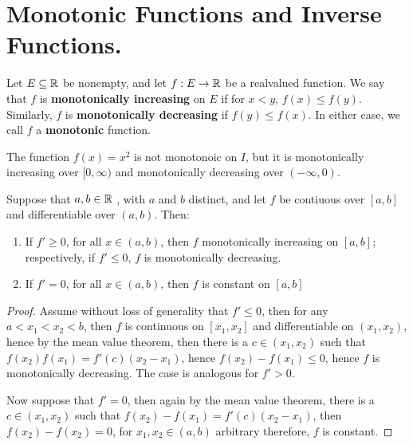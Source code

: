 
\section{Monotonic Functions and Inverse Functions.}

\begin{definition}
    Let $E \subseteq \mathbb{R}$ be nonempty, and let  $f:E \rightarrow \mathbb{R}$ be a realvalued function. 
    We say that $f$ is \textbf{monotonically increasing} on $E$ if for $x<y$, $f(x) \leq f(y)$. 
    Similarly, $f$ is \textbf{monotonically decreasing} if $f(y) \leq f(x)$. In either case, we call 
    $f$ a \textbf{monotonic} function.
\end{definition}

\begin{example}
    The function $f(x)=x^2$ is not monotonoic on  $I$, but it is monotonically increasing 
    over $[0,\infty)$ and monotonically decreasing over $(-\infty, 0)$. 
\end{example} 

\begin{theorem}\label{4.4.1}
    Suppose that $a, b \in \mathbb{R}$ , with  $a$ and  $b$ distinct, and let  $f$ be contiuous 
    over  $[a,b]$ and differentiable over  $(a,b)$. Then:
        \begin{enumerate}[label=(\arabic*)]
            \item If $f' \geq 0$, for all  $x \in (a,b)$, then $f$ monotonically increasing 
                on $[a,b]$; respectively, if  $f' \leq 0$,  $f$ is monotonically decreasing.

            \item If $f'=0$, for all  $x \in (a,b)$, then $f$ is constant on  $[a,b]$
        \end{enumerate}
\end{theorem}
\begin{proof}
    Assume without loss of generality that $f' \leq 0$, then for any  $a<x_1<x_2<b$, then 
    $f$ is continuous on  $[x_1,x_2]$ and differentiable on $(x_1,x_2)$, hence by the 
    mean value theorem, then there is a $c \in (x_1,x_2)$ such that $f(x_2)f(x_1)=f'(c)(x_2-x_1)$, 
    hence $f(x_2)-f(x_1) \leq 0$, hence $f$ is monotonically decreasing. The case is analogous 
    for  $f'>0$.

    Now suppose that  $f'=0$,  then again by the mean value theorem, there is a  $c \in (x_1,x_2)$ 
    such that $f(x_2)-f(x_1)=f'(c)(x_2-x_1)$, then $f(x_2)-f(x_2)=0$, for $x_1, x_2 \in (a,b)$ 
    arbitrary therefore, $f$ is constant.
\end{proof}

